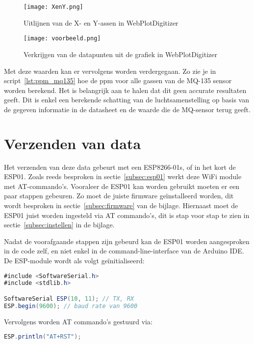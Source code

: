 \begin{figure}[h]
    \texttt{[image: XenY.png]}
    \caption[Uitlijnen X- en Y-assen]{Uitlijnen van de X- en Y-assen in WebPlotDigitizer}
    \label{fig:x_en_y}
\end{figure}

\begin{figure}[h]
    \texttt{[image: voorbeeld.png]}
    \caption[Datapunten uit WebPlotDigitizer]{Verkrijgen van de datapunten uit de grafiek in WebPlotDigitizer}
    \label{fig:voorbeeld}
\end{figure}

Met deze waarden kan er vervolgens worden verdergegaan. Zo zie je in script~\ref{lst:ppm_mq135} hoe de ppm voor alle gassen van de MQ-135 sensor worden berekend. Het is belangrijk aan te halen dat dit geen accurate resultaten geeft. Dit is enkel een berekende schatting van de luchtsamenstelling op basis van de gegeven informatie in de datasheet en de waarde die de MQ-sensor terug geeft.



\section{Verzenden van data}%
\label{sec:verzendendata}

Het verzenden van deze data gebeurt met een ESP8266-01s, of in het kort de ESP01. Zoals reeds besproken in sectie~\ref{subsec:esp01} werkt deze WiFi module met AT-commando's. Vooraleer de ESP01 kan worden gebruikt moeten er een paar stappen gebeuren. Zo moet de juiste firmware geïnstalleerd worden, dit wordt besproken in sectie~\ref{subsec:firmware} van de bijlage. Hiernaast moet de ESP01 juist worden ingesteld via AT commando's, dit is stap voor stap te zien in sectie~\ref{subsec:instellen} in de bijlage.

Nadat de voorafgaande stappen zijn gebeurd kan de ESP01 worden aangesproken in de code zelf, en niet enkel in de command-line-interface van de Arduino IDE. De ESP-module wordt als volgt geïnitialiseerd:
\begin{lstlisting}[language=Java, caption={Initialisatie van de ESP in Arduino}]
#include <SoftwareSerial.h>
#include <stdlib.h>

SoftwareSerial ESP(10, 11); // TX, RX
ESP.begin(9600); // baud rate van 9600
\end{lstlisting}

Vervolgens worden AT commando's gestuurd via:
\begin{lstlisting}[language=Java, caption={Voorbeeld: resetten van de ESP}]
ESP.println("AT+RST");
\end{lstlisting}

